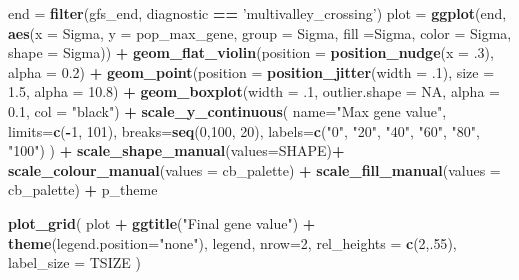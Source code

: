 \documentclass[]{book}
\newenvironment{Shaded}{\begin{snugshade}}{\end{snugshade}}
\newcommand{\DataTypeTok}[1]{\textcolor[rgb]{0.13,0.29,0.53}{#1}}
\newcommand{\DecValTok}[1]{\textcolor[rgb]{0.00,0.00,0.81}{#1}}
\newcommand{\FloatTok}[1]{\textcolor[rgb]{0.00,0.00,0.81}{#1}}
\newcommand{\KeywordTok}[1]{\textcolor[rgb]{0.13,0.29,0.53}{\textbf{#1}}}
\newcommand{\NormalTok}[1]{#1}
\newcommand{\OperatorTok}[1]{\textcolor[rgb]{0.81,0.36,0.00}{\textbf{#1}}}
\newcommand{\OtherTok}[1]{\textcolor[rgb]{0.56,0.35,0.01}{#1}}
\newcommand{\StringTok}[1]{\textcolor[rgb]{0.31,0.60,0.02}{#1}}
\begin{document}
\begin{Shaded}
\begin{Highlighting}[]
\NormalTok{end =}\StringTok{ }\KeywordTok{filter}\NormalTok{(gfs_end, diagnostic }\OperatorTok{==}\StringTok{ 'multivalley_crossing'}\NormalTok{)}
\NormalTok{plot =}\StringTok{ }\KeywordTok{ggplot}\NormalTok{(end, }\KeywordTok{aes}\NormalTok{(}\DataTypeTok{x =}\NormalTok{ Sigma, }\DataTypeTok{y =}\NormalTok{ pop_max_gene, }\DataTypeTok{group =}\NormalTok{ Sigma, }\DataTypeTok{fill =}\NormalTok{Sigma, }\DataTypeTok{color =}\NormalTok{ Sigma, }\DataTypeTok{shape =}\NormalTok{ Sigma)) }\OperatorTok{+}
\StringTok{  }\KeywordTok{geom_flat_violin}\NormalTok{(}\DataTypeTok{position =} \KeywordTok{position_nudge}\NormalTok{(}\DataTypeTok{x =} \FloatTok{.3}\NormalTok{), }\DataTypeTok{alpha =} \FloatTok{0.2}\NormalTok{) }\OperatorTok{+}
\StringTok{  }\KeywordTok{geom_point}\NormalTok{(}\DataTypeTok{position =} \KeywordTok{position_jitter}\NormalTok{(}\DataTypeTok{width =} \FloatTok{.1}\NormalTok{), }\DataTypeTok{size =} \FloatTok{1.5}\NormalTok{, }\DataTypeTok{alpha =} \FloatTok{10.8}\NormalTok{) }\OperatorTok{+}
\StringTok{  }\KeywordTok{geom_boxplot}\NormalTok{(}\DataTypeTok{width =} \FloatTok{.1}\NormalTok{, }\DataTypeTok{outlier.shape =} \OtherTok{NA}\NormalTok{, }\DataTypeTok{alpha =} \FloatTok{0.1}\NormalTok{, }\DataTypeTok{col =} \StringTok{"black"}\NormalTok{) }\OperatorTok{+}
\StringTok{  }\KeywordTok{scale_y_continuous}\NormalTok{(}
    \DataTypeTok{name=}\StringTok{"Max gene value"}\NormalTok{,}
    \DataTypeTok{limits=}\KeywordTok{c}\NormalTok{(}\OperatorTok{-}\DecValTok{1}\NormalTok{, }\DecValTok{101}\NormalTok{),}
    \DataTypeTok{breaks=}\KeywordTok{seq}\NormalTok{(}\DecValTok{0}\NormalTok{,}\DecValTok{100}\NormalTok{, }\DecValTok{20}\NormalTok{),}
    \DataTypeTok{labels=}\KeywordTok{c}\NormalTok{(}\StringTok{"0"}\NormalTok{, }\StringTok{"20"}\NormalTok{, }\StringTok{"40"}\NormalTok{, }\StringTok{"60"}\NormalTok{, }\StringTok{"80"}\NormalTok{, }\StringTok{"100"}\NormalTok{)}
\NormalTok{  ) }\OperatorTok{+}
\StringTok{  }\KeywordTok{scale_shape_manual}\NormalTok{(}\DataTypeTok{values=}\NormalTok{SHAPE)}\OperatorTok{+}
\StringTok{  }\KeywordTok{scale_colour_manual}\NormalTok{(}\DataTypeTok{values =}\NormalTok{ cb_palette) }\OperatorTok{+}
\StringTok{  }\KeywordTok{scale_fill_manual}\NormalTok{(}\DataTypeTok{values =}\NormalTok{ cb_palette) }\OperatorTok{+}
\StringTok{  }\NormalTok{p_theme}

\KeywordTok{plot_grid}\NormalTok{(}
\NormalTok{  plot }\OperatorTok{+}
\StringTok{    }\KeywordTok{ggtitle}\NormalTok{(}\StringTok{"Final gene value"}\NormalTok{) }\OperatorTok{+}
\StringTok{    }\KeywordTok{theme}\NormalTok{(}\DataTypeTok{legend.position=}\StringTok{"none"}\NormalTok{),}
\NormalTok{  legend,}
  \DataTypeTok{nrow=}\DecValTok{2}\NormalTok{,}
  \DataTypeTok{rel_heights =} \KeywordTok{c}\NormalTok{(}\DecValTok{2}\NormalTok{,.}\DecValTok{55}\NormalTok{),}
  \DataTypeTok{label_size =}\NormalTok{ TSIZE}
\NormalTok{)}
\end{Highlighting}
\end{Shaded}
\end{document}
